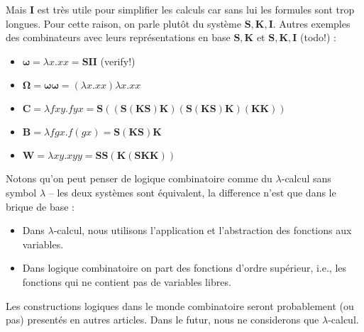 \documentclass[12pt, a4paper]{article}
\newcommand{\cK}{\mathbf{K}}
\newcommand{\cS}{\mathbf{S}}
\newcommand{\cI}{\mathbf{I}}
\begin{document}
Mais $\cI$ est très utile pour simplifier les calculs car sans lui les formules sont trop longues. Pour cette raison, on parle plutôt du système $\mathbf{S, K, I}$.
Autres exemples des combinateurs avec leurs représentations en base $\cS, \cK$ et $\cS, \cK, \cI$ (todo!) :
\begin{itemize}
	\item $\bm{\omega} = \lambda x. xx = \cS \mathbf{I} \mathbf{I}$ (verify!)
	\item $\mathbf{\Omega} = \bm{\omega} \bm{\omega} = (\lambda x. xx) \lambda x. xx$
	\item $\mathbf{C}
		= \lambda fxy. fyx
		= \cS
			\left(
				\left(\cS(\cK\cS)\cK\right)
				\left(\cS(\cK\cS)\cK\right)
				(\cK\cK)
			\right)$
	\item $\mathbf{B} = \lambda fgx. f(gx) = \cS(\cK\cS)\cK$
	\item $\mathbf{W} = \lambda xy. xyy = \cS \cS \left(\cK (\cS \cK \cK)\right)$
\end{itemize}


Notons qu'on peut penser de logique combinatoire comme du $\lambda$-calcul sans symbol $\lambda$ -- les deux systèmes sont équivalent, la difference n'est que dans le brique de base :
\begin{itemize}
	\item Dans $\lambda$-calcul, nous utilisons l'application et l'abstraction des fonctions aux variables.
	\item Dans logique combinatoire on part des fonctions d'ordre supérieur, i.e., les fonctions qui ne contient pas de variables libres.
\end{itemize}
Les constructions logiques dans le monde combinatoire seront probablement (ou pas) presentés en autres articles.
Dans le futur, nous ne considerons que $\lambda$-calcul.
\end{document}
